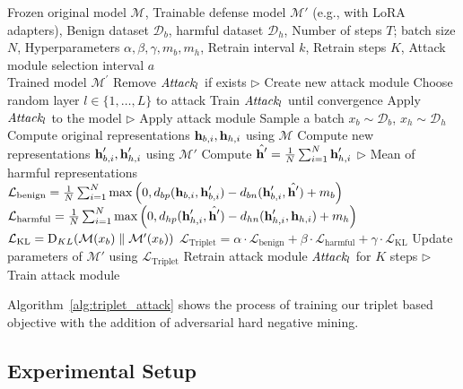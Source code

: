 \documentclass[11pt]{article}
\begin{document}
\begin{algorithm*}[htbp]
  \caption{Triplet Model Defense with Adversarial Hard Negative Mining}
  \label{alg:triplet_attack}
\begin{algorithmic}[1]
  \REQUIRE 
    Frozen original model $\mathcal{M}$, Trainable defense model $\mathcal{M}'$ (e.g., with LoRA adapters), Benign dataset $\mathcal{D}_b$, harmful dataset $\mathcal{D}_h$, Number of steps $T$; batch size $N$, Hyperparameters $\alpha, \beta, \gamma, m_b, m_h$, Retrain interval $k$, Retrain steps $K$, Attack module selection interval $a$ \\
  \ENSURE Trained model $\mathcal{M}^\prime$
      \STATE Remove $\textit{Attack}_l$ if exists \hfill $\triangleright$ Create new attack module
      \STATE Choose random layer $l\in\{1,\dots,L\}$ to attack
      \STATE Train $\textit{Attack}_l$ until convergence
      \STATE Apply $\textit{Attack}_l$ to the model \hfill $\triangleright$ Apply attack module
    \ENDIF
    \STATE Sample a batch $x_b \sim \mathcal{D}_b$, $x_h \sim \mathcal{D}_h$
    \STATE Compute original representations $\textbf{h}_{b, i}, \textbf{h}_{h, i}$ using $\mathcal{M}$
    \STATE Compute new representations $\textbf{h}^\prime_{b, i}, \textbf{h}^\prime_{h, i}$ using $\mathcal{M}'$
    \STATE Compute $\hat{\textbf{h}^\prime} = \frac{1}{N} \sum_{i=1}^{N} \textbf{h}^\prime_{h,i}$ \hfill $\triangleright$ Mean of harmful representations
    \STATE $\mathcal{L}_\text{benign} = \frac{1}{N} \sum_{i=1}^N \max\left(0, d_{bp}(\textbf{h}_{b,i}, \textbf{h}^\prime_{b,i}) - d_{bn}(\textbf{h}^\prime_{b,i}, \hat{\textbf{h}^\prime}) + m_b\right)$
    \STATE $\mathcal{L}_\text{harmful} = \frac{1}{N} \sum_{i=1}^N \max\left(0, d_{hp}(\textbf{h}^\prime_{h,i}, \hat{\textbf{h}^\prime}) - d_{hn}(\textbf{h}^\prime_{h,i}, \textbf{h}_{h,i}) + m_h\right)$
    \STATE $\mathcal{L}_\text{KL} = \mathrm{D}_{KL}(\mathcal{M}(x_b) \parallel \mathcal{M^\prime}(x_b))$
    \STATE $\mathcal{L}_\text{Triplet} = \alpha \cdot \mathcal{L}_\text{benign} + \beta \cdot \mathcal{L}_\text{harmful} + \gamma \cdot \mathcal{L}_\text{KL}$
    \STATE Update parameters of $\mathcal{M}'$ using $\mathcal{L}_\text{Triplet}$
      \STATE Retrain attack module $\textit{Attack}_l$ for $K$ steps \hfill $\triangleright$ Train attack module
    \ENDIF
  \ENDFOR
\end{algorithmic}
\end{algorithm*}

Algorithm~\ref{alg:triplet_attack} shows the process of training our triplet based objective
with the addition of adversarial hard negative mining.

\subsection{Experimental Setup}
\label{app:setup}
\end{document}
